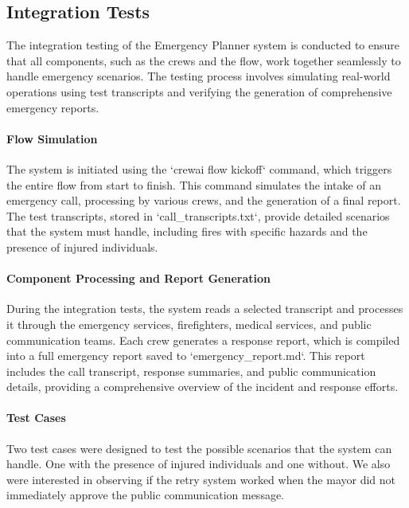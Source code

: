\subsection{Integration Tests}
\label{subsec:integration_tests}

The integration testing of the Emergency Planner system is conducted to ensure that all components, such as the crews and the flow, work together seamlessly to handle emergency scenarios. The testing process involves simulating real-world operations using test transcripts and verifying the generation of comprehensive emergency reports.

\paragraph{Flow Simulation}
The system is initiated using the `crewai flow kickoff` command, which triggers the entire flow from start to finish. This command simulates the intake of an emergency call, processing by various crews, and the generation of a final report. The test transcripts, stored in `call\_transcripts.txt`, provide detailed scenarios that the system must handle, including fires with specific hazards and the presence of injured individuals.

\paragraph{Component Processing and Report Generation}
During the integration tests, the system reads a selected transcript and processes it through the emergency services, firefighters, medical services, and public communication teams. Each crew generates a response report, which is compiled into a full emergency report saved to `emergency\_report.md`. This report includes the call transcript, response summaries, and public communication details, providing a comprehensive overview of the incident and response efforts.

\paragraph{Test Cases}
Two test cases were designed to test the possible scenarios that the system can handle. One with the presence of injured individuals and one without. We also were interested in observing if the retry system worked when the mayor did not immediately approve the public communication message.

